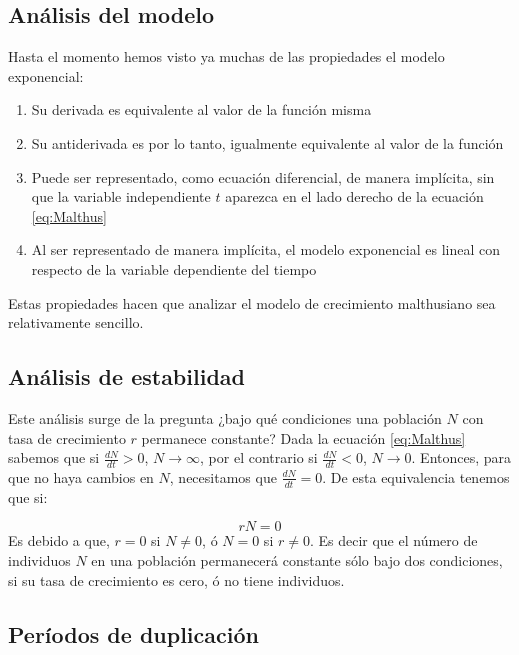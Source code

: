 \documentclass[
]{book}
\providecommand{\tightlist}{%
  \setlength{\itemsep}{0pt}\setlength{\parskip}{0pt}}
\begin{document}
\hypertarget{anuxe1lisis-del-modelo}{%
\subsection{Análisis del modelo}\label{anuxe1lisis-del-modelo}}

Hasta el momento hemos visto ya muchas de las propiedades el modelo exponencial:

\begin{enumerate}
\def\labelenumi{\arabic{enumi}.}
\tightlist
\item
  Su derivada es equivalente al valor de la función misma
\item
  Su antiderivada es por lo tanto, igualmente equivalente al valor de la función
\item
  Puede ser representado, como ecuación diferencial, de manera implícita, sin que la variable independiente \(t\) aparezca en el lado derecho de la ecuación \eqref{eq:Malthus}
\item
  Al ser representado de manera implícita, el modelo exponencial es lineal con respecto de la variable dependiente del tiempo
\end{enumerate}

Estas propiedades hacen que analizar el modelo de crecimiento malthusiano sea relativamente sencillo.

\hypertarget{anuxe1lisis-de-estabilidad}{%
\subsection{Análisis de estabilidad}\label{anuxe1lisis-de-estabilidad}}

Este análisis surge de la pregunta ¿bajo qué condiciones una población \(N\) con tasa de crecimiento \(r\) permanece constante? Dada la ecuación \eqref{eq:Malthus} sabemos que si \(\frac{dN}{dt} > 0\), \(N \rightarrow \infty\), por el contrario si \(\frac{dN}{dt} < 0\), \(N \rightarrow 0\). Entonces, para que no haya cambios en \(N\), necesitamos que \(\frac{dN}{dt} = 0\). De esta equivalencia tenemos que si:

\[rN = 0\]
Es debido a que, \(r=0\) si \(N \neq 0\), ó \(N=0\) si \(r \neq 0\). Es decir que el número de individuos \(N\) en una población permanecerá constante sólo bajo dos condiciones, si su tasa de crecimiento es cero, ó no tiene individuos.

\hypertarget{peruxedodos-de-duplicaciuxf3n}{%
\subsection{Períodos de duplicación}\label{peruxedodos-de-duplicaciuxf3n}}
\end{document}
